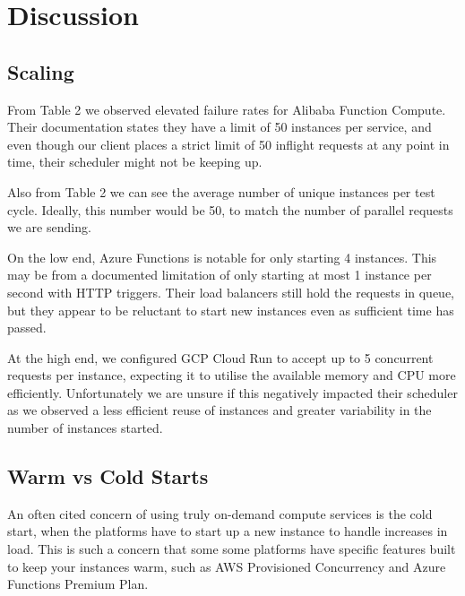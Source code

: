 \documentclass[11pt]{article}
\begin{document}

\section{Discussion}

\subsection{Scaling}
From Table 2 %
we observed elevated failure rates for Alibaba Function Compute.
Their documentation %
states they have a limit of 50 instances per service,
and even though our client places a strict limit of 50 inflight requests at any point in time,
their scheduler might not be keeping up.

Also from Table 2 %
we can see the average number of unique instances per test cycle.
Ideally, this number would be 50,
to match the number of parallel requests we are sending.

On the low end,
Azure Functions is notable for only starting 4 instances.
This may be from a documented limitation %
of only starting at most 1 instance per second with HTTP triggers.
Their load balancers still hold the requests in queue,
but they appear to be reluctant to start new instances even as sufficient time has passed.

At the high end,
we configured GCP Cloud Run to accept up to 5 concurrent requests per instance,
expecting it to utilise the available memory and CPU more efficiently.
Unfortunately we are unsure if this negatively impacted their scheduler
as we observed a less efficient reuse of instances
and greater variability in the number of instances started.

\subsection{Warm vs Cold Starts}
An often cited concern of using truly on-demand compute services is the cold start,
when the platforms have to start up a new instance to handle increases in load.
This is such a concern that some some platforms have specific features
built to keep your instances warm, such as AWS Provisioned Concurrency %
and Azure Functions Premium Plan.
\end{document}
